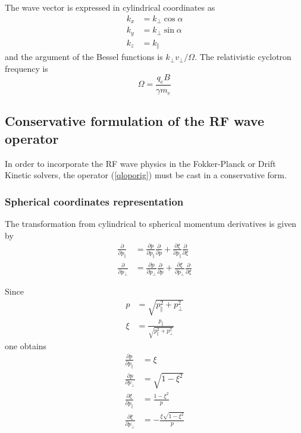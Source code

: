 The wave vector is expressed in cylindrical coordinates as
\begin{align}
k_{x}  &  =k_{\bot}\cos\alpha\\
k_{y}  &  =k_{\bot}\sin\alpha\nonumber\\
k_{z}  &  =k_{\Vert}\nonumber
\end{align}
and the argument of the Bessel functions is $k_{\bot}v_{\bot}/\Omega$. The
relativistic cyclotron frequency is
\begin{equation}
\Omega=\frac{q_{e}B}{\gamma m_{e}}%
\end{equation}

\subsection{Conservative formulation of the RF wave operator}

In order to incorporate the RF wave physics in the Fokker-Planck or Drift
Kinetic solvers, the operator (\ref{qloporig}) must be cast in a conservative form.

\subsubsection{Spherical coordinates representation}

The transformation from cylindrical to spherical momentum derivatives is given
by
\begin{align}
\frac{\partial}{\partial p_{\Vert}}  &  =\frac{\partial p}{\partial p_{\Vert}%
}\frac{\partial}{\partial p}+\frac{\partial\xi}{\partial p_{\Vert}}%
\frac{\partial}{\partial\xi}\label{dppar}\\
\frac{\partial}{\partial p_{\bot}}  &  =\frac{\partial p}{\partial p_{\bot}%
}\frac{\partial}{\partial p}+\frac{\partial\xi}{\partial p_{\bot}}%
\frac{\partial}{\partial\xi} \label{dpperp}%
\end{align}

Since
\begin{align}
p  &  =\sqrt{p_{\Vert}^{2}+p_{\bot}^{2}}\\
\xi &  =\frac{p_{\Vert}}{\sqrt{p_{\Vert}^{2}+p_{\bot}^{2}}}%
\end{align}
one obtains
\begin{align}
\frac{\partial p}{\partial p_{\Vert}}  &  =\xi\\
\frac{\partial p}{\partial p_{\bot}}  &  =\sqrt{1-\xi^{2}}\\
\frac{\partial\xi}{\partial p_{\Vert}}  &  =\frac{1-\xi^{2}}{p}\\
\frac{\partial\xi}{\partial p_{\bot}}  &  =-\frac{\xi\sqrt{1-\xi^{2}}}{p}%
\end{align}

